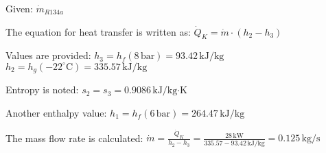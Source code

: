 Given: \( \dot{m}_{R134a} \)  

The equation for heat transfer is written as:  
\( \dot{Q}_K = \dot{m} \cdot (h_2 - h_3) \)  

Values are provided:  
\( h_3 = h_f (8 \, \text{bar}) = 93.42 \, \text{kJ/kg} \)  
\( h_2 = h_g (-22^\circ \text{C}) = 335.57 \, \text{kJ/kg} \)  

Entropy is noted:  
\( s_2 = s_3 = 0.9086 \, \text{kJ/kg·K} \)  

Another enthalpy value:  
\( h_1 = h_f (6 \, \text{bar}) = 264.47 \, \text{kJ/kg} \)  

The mass flow rate is calculated:  
\( \dot{m} = \frac{\dot{Q}_K}{h_2 - h_3} = \frac{28 \, \text{kW}}{335.57 - 93.42 \, \text{kJ/kg}} = 0.125 \, \text{kg/s} \)